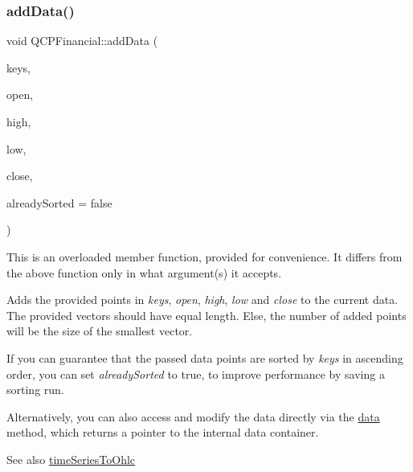 \subsubsection{\texorpdfstring{add\+Data()}{addData()}\hspace{0.1cm}{\footnotesize\ttfamily [1/2]}}
{\footnotesize\ttfamily void Q\+C\+P\+Financial\+::add\+Data (\begin{DoxyParamCaption}\item[{const Q\+Vector$<$ double $>$ \&}]{keys,  }\item[{const Q\+Vector$<$ double $>$ \&}]{open,  }\item[{const Q\+Vector$<$ double $>$ \&}]{high,  }\item[{const Q\+Vector$<$ double $>$ \&}]{low,  }\item[{const Q\+Vector$<$ double $>$ \&}]{close,  }\item[{bool}]{already\+Sorted = {\ttfamily false} }\end{DoxyParamCaption})}

This is an overloaded member function, provided for convenience. It differs from the above function only in what argument(s) it accepts.

Adds the provided points in {\itshape keys}, {\itshape open}, {\itshape high}, {\itshape low} and {\itshape close} to the current data. The provided vectors should have equal length. Else, the number of added points will be the size of the smallest vector.

If you can guarantee that the passed data points are sorted by {\itshape keys} in ascending order, you can set {\itshape already\+Sorted} to true, to improve performance by saving a sorting run.

Alternatively, you can also access and modify the data directly via the \mbox{\hyperlink{class_q_c_p_financial_aec3f666271cf48bd7b87d84fe3f8c074}{data}} method, which returns a pointer to the internal data container.

\begin{DoxySeeAlso}{See also}
\mbox{\hyperlink{class_q_c_p_financial_a9a058c035040d3939b8884f4aaccb1a7}{time\+Series\+To\+Ohlc}} 
\end{DoxySeeAlso}
\mbox{\label{class_q_c_p_financial_a688bbd052e00a02954ddb0068b378170}} 
